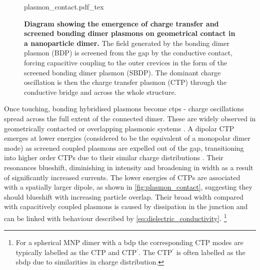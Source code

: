 \documentclass{article}
\begin{document}
\begin{figure}[bt]
\centering
\fontsize{10pt}{1em}\selectfont
\def\svgwidth{0.65\textwidth}
{plasmon_contact.pdf_tex}
\caption[Diagram showing the emergence of charge transfer and screened bonding dimer plasmons on geometrical contact in a nanoparticle dimer]{\textbf{Diagram showing the emergence of charge transfer and screened bonding dimer plasmons on geometrical contact in a nanoparticle dimer.} The field generated by the bonding dimer plasmon (BDP) is screened from the gap by the conductive contact, forcing capacitive coupling to the outer crevices in the form of the screened bonding dimer plasmon (SBDP). The dominant charge oscillation is then the charge transfer plasmon (CTP) through the conductive bridge and across the whole structure.}
\label{fig:plasmon_contact}
\end{figure}

Once touching, bonding hybridised plasmons become \glspl{ctp} - charge oscillations spread across the full extent of the connected dimer. These are widely observed in geometrically contacted or overlapping plasmonic systems \cite{atay2004, lassiter2008}. A dipolar CTP emerges at lower energies (considered to be the equivalent of a monopolar dimer mode) as screened coupled plasmons are expelled out of the gap, transitioning into higher order CTPs due to their similar charge distributions \cite{romero2006, perez2010, perez2011, tserkezis2014}. Their resonances blueshift, diminishing in intensity and broadening in width as a result of significantly increased currents. The lower energies of CTPs are associated with a spatially larger dipole, as shown in \autoref{fig:plasmon_contact}, suggesting they should blueshift with increasing particle overlap. Their broad width compared with capacitively coupled plasmons is caused by dissipation in the junction and can be linked with behaviour described by \eqref{eq:dielectric_conductivity}.%
\footnote{For a spherical MNP dimer with a \gls{bdp} the corresponding CTP modes are typically labelled as the CTP and CTP$^\prime$. The CTP$^\prime$ is often labelled as the \gls{sbdp} due to similarities in charge distribution.} 
\end{document}
